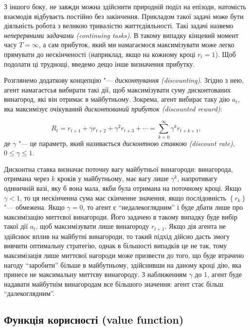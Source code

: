 З іншого боку, не завжди можна здійснити природній поділ на епізоди, натомість взаємодія відбуваєть постійно без закінчення. Прикладом такої задачі може бути діяльність робота з великою тривалістю життєдіяльності. Такі задачі назвемо \emph{неперервними задачами (continuing tasks)}. В такому випадку кінцевий момент часу $T=\infty$, а сам прибуток, який ми намагаємося максимізувати може легко прямувати до нескінченості (наприклад, якщо на кожному кроці $r_t=1$). Щоб подолати ці труднощі, введемо дещо інше визначення прибутку.

Розглянемо додаткову концепцію "--- \emph{дисконтування (discounting)}. Згідно з нею, агент намагаєтсья вибирати такі дії, щоб максимізувати суму дисконтованих винагород, які він отримає в майбутньому. Зокрема, агент вибирає таку дію $a_t$, яка максимізує очікуваний \emph{дисконтований прибуток (discounted reward)}:

\begin{equation}
R_t = r_{t+1} + \gamma r_{t+2} + \gamma^2 r_{t+3} + \cdots = \sum_{k=0}^{\infty}\gamma^k r_{t+k+1},
\end{equation}
де $\gamma$ "--- це параметр, який називається \emph{дисконтною ставкою (discount rate)}, $0\leq\gamma\leq 1$.

Дисконтна ставка визначає поточну вагу майбутньої винагороди: винагорода, отримана через $k$ кроків у майбутньому, має вагу лише $\gamma^k$, напротивагу одиничній вазі, яку б вона мала, якби була отримана на поточному кроці. Якщо $\gamma<1$, то ця нескінченна сума має скінченне значення, якщо послідовність $\left\{r_k\right\}$ "--- обмежена. Якщо $\gamma = 0$, то агент є ``недалекоглядним'' і буде дбати лише про максимізацію миттєвої винагороди. Його задачею в такому випадку буде вибір такої дії $a_t$, щоб максимізувати лише винагороду $r_{t+1}$. Якщо дія агента не здійснює вплив на майбутні винагороди, то такий підхід дійсно дасть змогу вивчити оптимальну стратегію, однак в більшості випадків це не так, тому максимізація лише миттєвої нагороди може призвести до того, що буде втрачено нагоду ``заробити'' більше в майбутньому, здійснивши на даному кроці дію, яка принесе не максимальну миттєву винагороду. З наближенням $\gamma$ до 1, агент буде надавати майбутнім винагородам все більшого значення: агент стає більш ``далекоглядним''.

\subsection{Функція корисності (value function)}

